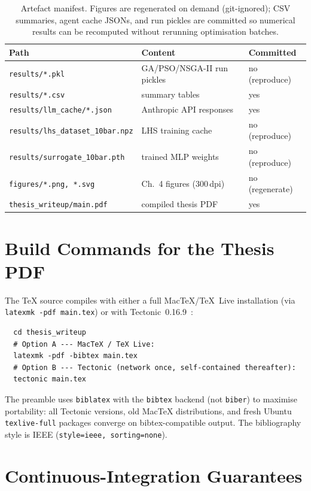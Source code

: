 \begin{table}[h]
  \centering
  \caption{Artefact manifest. Figures are regenerated on demand
    (git-ignored); CSV summaries, agent cache JSONs, and run
    pickles are committed so numerical results can be recomputed
    without rerunning optimisation batches.}
  \label{tab:artefacts}
  \small
  \begin{tabular}{@{}l l l@{}}
    \toprule
    Path & Content & Committed \\
    \midrule
    \texttt{results/*.pkl}         & GA/PSO/NSGA-II run pickles & no (reproduce) \\
    \texttt{results/*.csv}         & summary tables & yes \\
    \texttt{results/llm\_cache/*.json} & Anthropic API responses & yes \\
    \texttt{results/lhs\_dataset\_10bar.npz} & LHS training cache & no (reproduce) \\
    \texttt{results/surrogate\_10bar.pth}    & trained MLP weights & no (reproduce) \\
    \texttt{figures/*.png, *.svg}    & Ch.~4 figures (300\,dpi) & no (regenerate) \\
    \texttt{thesis\_writeup/main.pdf} & compiled thesis PDF & yes \\
    \bottomrule
  \end{tabular}
\end{table}

\section{Build Commands for the Thesis PDF}
\label{app:repro:pdfbuild}

The TeX source compiles with either a full MacTeX/TeX~Live
installation (via \texttt{latexmk~-pdf~main.tex}) or with
Tectonic~0.16.9~\cite{tectonic2024}:
\begin{verbatim}
  cd thesis_writeup
  # Option A --- MacTeX / TeX Live:
  latexmk -pdf -bibtex main.tex
  # Option B --- Tectonic (network once, self-contained thereafter):
  tectonic main.tex
\end{verbatim}
The preamble uses \texttt{biblatex} with the \texttt{bibtex}
backend (not \texttt{biber}) to maximise portability: all
Tectonic versions, old Mac\-TeX distributions, and fresh Ubuntu
\texttt{texlive-full} packages converge on bibtex-compatible
output. The bibliography style is IEEE
(\texttt{style=ieee, sorting=none}).

\section{Continuous-Integration Guarantees}
\label{app:repro:ci}

